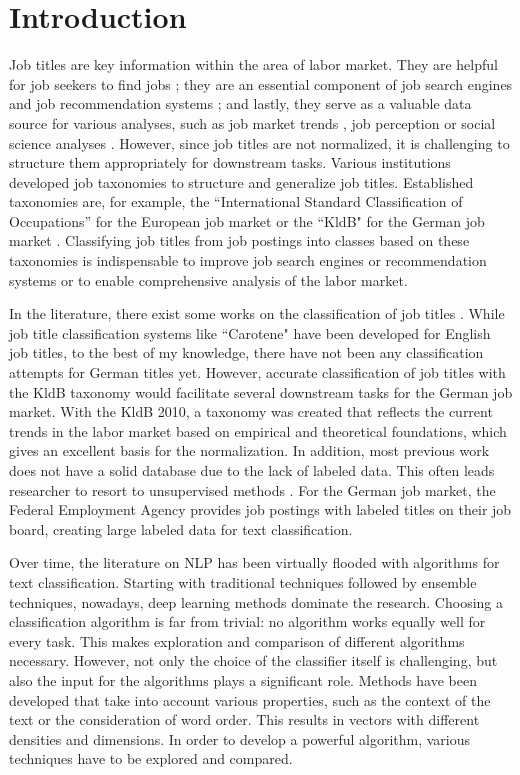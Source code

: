 \documentclass[12pt, a4paper, titlepage]{article}
\begin{document}
\section{Introduction}
Job titles are key information within the area of labor market. They are helpful for job seekers to find jobs \citep{marinescu2020}; they are an essential component of job search engines \citep{slamet2018, javed2015, javed2016} and job recommendation systems \citep{malherbe2014}; and lastly, they serve as a valuable data source for various analyses, such as job market trends \citep{martin2021, li2021}, job perception \citep{smith1989, boydston2020} or social science analyses \citep{martin2021}. However, since job titles are not normalized, it is challenging to structure them appropriately for downstream tasks. Various institutions developed job taxonomies to structure and generalize job titles. Established taxonomies are, for example, the ``International Standard Classification of Occupations'' for the European job market or the ``\ac{KldB}" for the German job market \citep{uter2020}. Classifying job titles from job postings into classes based on these taxonomies is indispensable to improve job search engines or recommendation systems or to enable comprehensive analysis of the labor market. 

In the literature, there exist some works on the classification of job titles \citep{zhu2016, javed2015, decorte2021, wang2019,neculoiu2016}. While job title classification systems like ``Carotene" \citep{javed2015} have been developed for English job titles, to the best of my knowledge, there have not been any classification attempts for German titles yet. However, accurate classification of job titles with the \ac{KldB} taxonomy would facilitate several downstream tasks for the German job market. With the \ac{KldB} 2010, a taxonomy was created that reflects the current trends in the labor market based on empirical and theoretical foundations, which gives an excellent basis for the normalization. In addition, most previous work does not have a solid database due to the lack of labeled data. This often leads researcher to resort to unsupervised methods \citep{decorte2021, javed2015}. For the German job market, the Federal Employment Agency provides job postings with labeled titles on their job board, creating large labeled data for text classification. 

Over time, the literature on \ac{NLP} has been virtually flooded with algorithms for text classification. Starting with traditional techniques followed by ensemble techniques, nowadays, deep learning methods dominate the research. Choosing a classification algorithm is far from trivial: no algorithm works equally well for every task. This makes exploration and comparison of different algorithms necessary. However, not only the choice of the classifier itself is challenging, but also the input for the algorithms plays a significant role. Methods have been developed that take into account various properties, such as the context of the text or the consideration of word order. This results in vectors with different densities and dimensions. In order to develop a powerful algorithm, various techniques have to be explored and compared.
\end{document}
